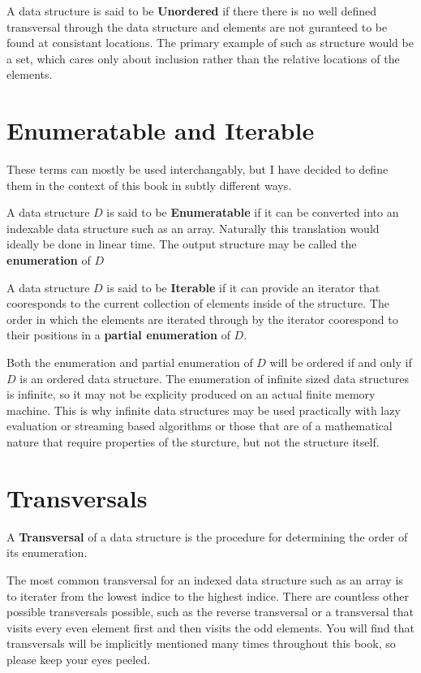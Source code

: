 \documentclass[12pt, letterpaper]{book}
\begin{document}
A data structure is said to be \textbf{Unordered} if there there is no well defined transversal through the data structure and elements are not guranteed to be found at consistant locations. The primary example of such as structure would be a set, which cares only about inclusion rather than the relative locations of the elements.


\section{Enumeratable and Iterable}

These terms can mostly be used interchangably, but I have decided to define them in the context of this book in subtly different ways.

A data structure $D$ is said to be \textbf{Enumeratable} if it can be converted into an indexable data structure such as an array. Naturally this translation would ideally be done in linear time. The output structure may be called the \textbf{enumeration} of $D$

A data structure $D$ is said to be \textbf{Iterable} if it can provide an iterator that cooresponds to the current collection of elements inside of the structure. The order in which the elements are iterated through by the iterator coorespond to their positions in a \textbf{partial enumeration} of $D$.

Both the enumeration and partial enumeration of $D$ will be ordered if and only if $D$ is an ordered data structure. The enumeration of infinite sized data structures is infinite, so it may not be explicity produced on an actual finite memory machine. This is why infinite data structures may be used practically with lazy evaluation or streaming based algorithms or those that are of a mathematical nature that require properties of the sturcture, but not the structure itself. 

\section{Transversals}

A \textbf{Transversal} of a data structure is the procedure for determining the order of its enumeration.

The most common transversal for an indexed data structure such as an array is to iterater from the lowest indice to the highest indice. There are countless other possible transversals possible, such as the reverse transversal or a transversal that visits every even element first and then visits the odd elements. You will find that transversals will be implicitly mentioned many times throughout this book, so please keep your eyes peeled.
\end{document}
